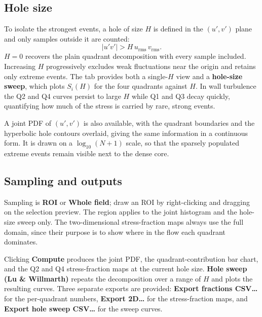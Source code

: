 \documentclass[11pt, a4paper]{report}
\newcommand{\uipth}[1]{\textbf{\textcolor{upblue}{#1}}}
\begin{document}
\subsection*{Hole size}

To isolate the strongest events, a hole of size $H$ is defined in the $(u', v')$ plane and only samples outside it are counted:
\[
\left| u'v' \right| > H \, u_{\mathrm{rms}} \, v_{\mathrm{rms}} .
\]
$H = 0$ recovers the plain quadrant decomposition with every sample included. Increasing $H$ progressively excludes weak fluctuations near the origin and retains only extreme events. The tab provides both a single-$H$ view and a \textbf{hole-size sweep}, which plots $S_i(H)$ for the four quadrants against $H$. In wall turbulence the Q2 and Q4 curves persist to large $H$ while Q1 and Q3 decay quickly, quantifying how much of the stress is carried by rare, strong events.

A joint PDF of $(u', v')$ is also available, with the quadrant boundaries and the hyperbolic hole contours overlaid, giving the same information in a continuous form. It is drawn on a $\log_{10}(N+1)$ scale, so that the sparsely populated extreme events remain visible next to the dense core.

\subsection*{Sampling and outputs}

Sampling is \uipth{ROI} or \uipth{Whole field}; draw an ROI by right-clicking and dragging on the selection preview. The region applies to the joint histogram and the hole-size sweep only. The two-dimensional stress-fraction maps always use the full domain, since their purpose is to show where in the flow each quadrant dominates.

Clicking \uipth{Compute} produces the joint PDF, the quadrant-contribution bar chart, and the Q2 and Q4 stress-fraction maps at the current hole size. \uipth{Hole sweep (Lu \& Willmarth)} repeats the decomposition over a range of $H$ and plots the resulting curves. Three separate exports are provided: \uipth{Export fractions CSV\ldots} for the per-quadrant numbers, \uipth{Export 2D\ldots} for the stress-fraction maps, and \uipth{Export hole sweep CSV\ldots} for the sweep curves.
\end{document}
